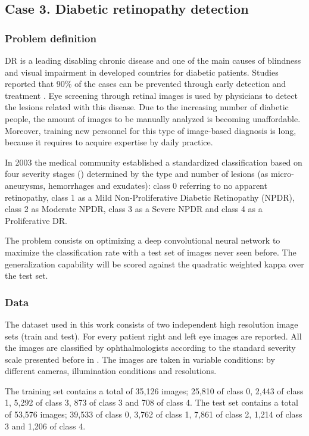 \subsection{Case 3. Diabetic retinopathy detection}
\subsubsection{Problem definition}

DR is a leading disabling chronic disease  and  one of the main causes of blindness and visual impairment in developed countries for diabetic patients. Studies reported that 90\% of the cases can be prevented through early detection and treatment \citep{romero2006nonproliferative}. Eye screening through retinal images is used by physicians to detect the lesions related with this disease. Due to the increasing number of diabetic people, the amount of images to be manually analyzed is becoming unaffordable. Moreover, training new personnel for this type of image-based diagnosis is long, because it requires to acquire expertise by daily practice. 

In 2003 the medical community established a standardized classification based on four severity stages (\citep{diaclass}) determined by the type and number of lesions (as micro-aneurysms, hemorrhages and exudates): class 0 referring to no apparent retinopathy, class 1 as a Mild Non-Proliferative Diabetic Retinopathy (NPDR), class 2 as Moderate NPDR, class 3 as a Severe NPDR and class 4 as a Proliferative DR. 

The problem consists on optimizing a deep convolutional neural network to maximize the classification rate with a test set of images never seen before. The generalization capability will be scored against the quadratic weighted kappa over the test set.

\subsubsection{Data}

The dataset used in this work consists of two independent high resolution image sets (train and test). For every patient right and left eye images are reported. All the images are classified by ophthalmologists according to the standard severity scale presented before in \citep{diaclass}. The images are taken in variable conditions: by different cameras, illumination conditions and resolutions. 

The training set contains a total of 35,126 images; 25,810 of class 0, 2,443 of class 1, 5,292 of class 3, 873 of class 3 and 708 of class 4. The test set contains a total of 53,576 images; 39,533 of class 0, 3,762 of class 1, 7,861 of class 2, 1,214 of class 3 and 1,206 of class 4. 


